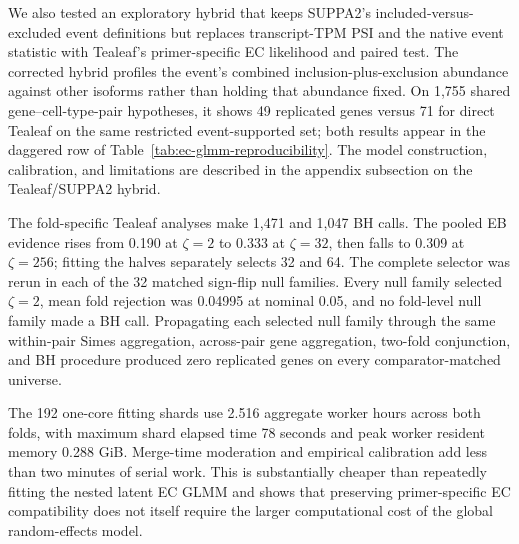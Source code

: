 \documentclass[11pt]{article}
\begin{document}
We also tested an exploratory hybrid that keeps SUPPA2's included-versus-excluded event definitions but replaces transcript-TPM PSI and the native event statistic with Tealeaf's primer-specific EC likelihood and paired test. The corrected hybrid profiles the event's combined inclusion-plus-exclusion abundance against other isoforms rather than holding that abundance fixed. On 1,755 shared gene--cell-type-pair hypotheses, it shows 49 replicated genes versus 71 for direct Tealeaf on the same restricted event-supported set; both results appear in the daggered row of Table~\ref{tab:ec-glmm-reproducibility}. The model construction, calibration, and limitations are described in the appendix subsection on the Tealeaf/SUPPA2 hybrid.

The fold-specific Tealeaf analyses make 1,471 and 1,047 BH calls. The pooled EB evidence rises from 0.190 at \(\zeta=2\) to 0.333 at \(\zeta=32\), then falls to 0.309 at \(\zeta=256\); fitting the halves separately selects 32 and 64. The complete selector was rerun in each of the 32 matched sign-flip null families. Every null family selected \(\zeta=2\), mean fold rejection was 0.04995 at nominal 0.05, and no fold-level null family made a BH call. Propagating each selected null family through the same within-pair Simes aggregation, across-pair gene aggregation, two-fold conjunction, and BH procedure produced zero replicated genes on every comparator-matched universe.

The 192 one-core fitting shards use 2.516 aggregate worker hours across both folds, with maximum shard elapsed time 78 seconds and peak worker resident memory 0.288 GiB. Merge-time moderation and empirical calibration add less than two minutes of serial work. This is substantially cheaper than repeatedly fitting the nested latent EC GLMM and shows that preserving primer-specific EC compatibility does not itself require the larger computational cost of the global random-effects model.
\end{document}

